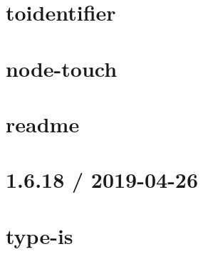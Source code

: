 \let\mypdfximage\pdfximage\def\pdfximage{\immediate\mypdfximage}\documentclass[twoside]{book}
\newcommand{\+}{\discretionary{\mbox{\scriptsize$\hookleftarrow$}}{}{}}
\begin{document}
\chapter{toidentifier}
\label{md__c_1__git_hub__p_r_o_y_e_c_t_o-_i_i_i-_g_o_t_rest-api-node-mysql_node_modules_toidentifier__r_e_a_d_m_e}

\chapter{node-\/touch}
\label{md__c_1__git_hub__p_r_o_y_e_c_t_o-_i_i_i-_g_o_t_rest-api-node-mysql_node_modules_touch__r_e_a_d_m_e}

\chapter{readme}
\label{md__c_1__git_hub__p_r_o_y_e_c_t_o-_i_i_i-_g_o_t_rest-api-node-mysql_node_modules_type-fest_readme}

\chapter{1.6.18 / 2019-\/04-\/26}
\label{md__c_1__git_hub__p_r_o_y_e_c_t_o-_i_i_i-_g_o_t_rest-api-node-mysql_node_modules_type-is__h_i_s_t_o_r_y}

\chapter{type-\/is}
\label{md__c_1__git_hub__p_r_o_y_e_c_t_o-_i_i_i-_g_o_t_rest-api-node-mysql_node_modules_type-is__r_e_a_d_m_e}

\end{document}
